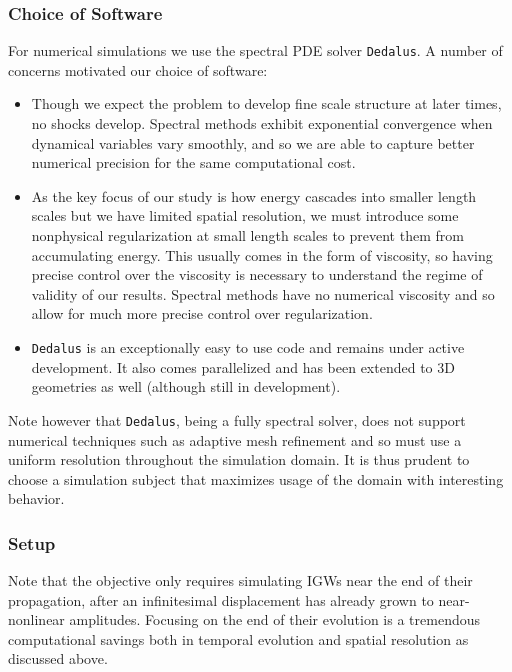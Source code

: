 \documentclass[11pt,
        usenames, %
        dvipsnames %
    ]{article}
\begin{document}
\subsubsection{Choice of Software}

For numerical simulations we use the spectral PDE solver
\lstinline{Dedalus}\cite{dedalus}. A number of concerns motivated our choice of
software:
\begin{itemize}
    \item Though we expect the problem to develop fine scale structure at later
        times, no shocks develop. Spectral methods exhibit exponential
        convergence when dynamical variables vary smoothly\cite{NR}, and so we
        are able to capture better numerical precision for the same
        computational cost.

    \item As the key focus of our study is how energy cascades into smaller
        length scales but we have limited spatial resolution, we must introduce
        some nonphysical regularization at small length scales to prevent them
        from accumulating energy. This usually comes in the form of viscosity,
        so having precise control over the viscosity is necessary to understand
        the regime of validity of our results. Spectral methods have no
        numerical viscosity\cite{NR} and so allow for much more precise control
        over regularization.

    \item \lstinline{Dedalus} is an exceptionally easy to use code and remains
        under active development. It also comes parallelized and has been
        extended to 3D geometries as well (although still in development).
\end{itemize}
Note however that \lstinline{Dedalus}, being a fully spectral solver, does not
support numerical techniques such as adaptive mesh refinement and so must use a
uniform resolution throughout the simulation domain. It is thus prudent to
choose a simulation subject that maximizes usage of the domain with interesting
behavior.

\subsubsection{Setup}

Note that the objective only requires simulating IGWs near the end of their
propagation, after an infinitesimal displacement has already grown to
near-nonlinear amplitudes. Focusing on the end of their evolution is a
tremendous computational savings both in temporal evolution and spatial
resolution as discussed above.
\end{document}
